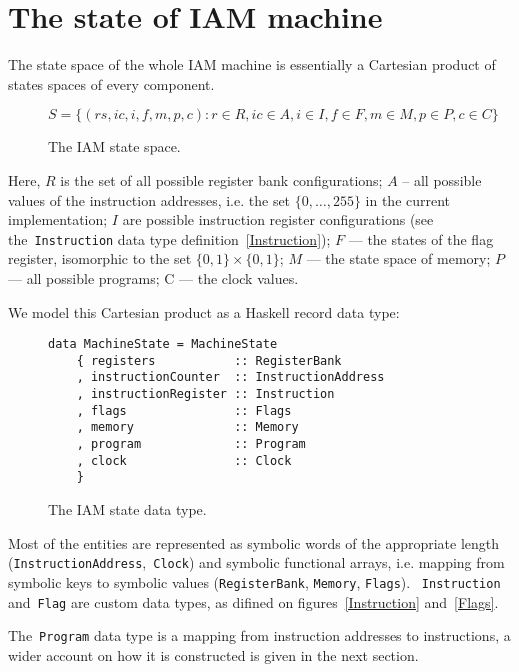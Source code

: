 \section{The state of IAM machine}
\label{sec:State}

The state space of the whole IAM machine is essentially a Cartesian product of states spaces
of every component.

\begin{figure}[H]
\centering
$S = \{(rs, ic, i, f, m, p, c) : r \in R, ic \in A, i \in I, f \in F, m \in M, p \in P, c \in C\}$
\caption{The IAM state space.}
\label{stateSpace}
\end{figure}

Here, $R$ is the set of all possible register bank configurations; $A$ -- all possible values
of the instruction addresses, i.e. the set $\{0,\ldots,255\}$ in the current implementation;
$I$ are possible instruction register configurations (see the~\texttt{Instruction}
data type definition~\ref{Instruction}); $F$ --- the states of the flag register, isomorphic to the set
$\{0,1\} \times \{0,1\}$; $M$ --- the state space of memory; $P$ --- all possible programs;
C --- the clock values.

We model this Cartesian product as a Haskell record data type:

\begin{figure}[H]
\begin{verbatim}
data MachineState = MachineState
    { registers           :: RegisterBank
    , instructionCounter  :: InstructionAddress
    , instructionRegister :: Instruction
    , flags               :: Flags
    , memory              :: Memory
    , program             :: Program
    , clock               :: Clock
    }
\end{verbatim}
\caption{The IAM state data type.}
\label{state}
\end{figure}

Most of the entities are represented as symbolic words of the appropriate
length (\texttt{InstructionAddress},~\texttt{Clock}) and
symbolic functional arrays, i.e. mapping from symbolic keys to symbolic
values (\texttt{RegisterBank}, \texttt{Memory}, \texttt{Flags}).
~\texttt{Instruction} and~\texttt{Flag} are custom data types,
as difined on figures~\ref{Instruction} and~\ref{Flags}.

The~\texttt{Program} data type is a mapping from instruction addresses to
instructions, a wider account on how it is constructed is given in the next section.